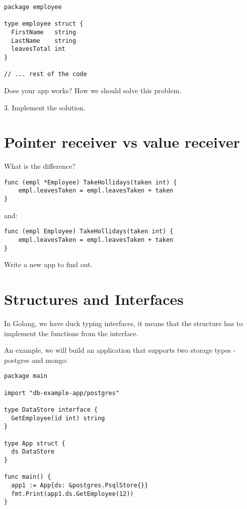 \documentclass[11pt, letterpaper]{article}
\begin{document}
\begin{verbatim}
package employee

type employee struct {
  FirstName   string
  LastName    string
  leavesTotal int
}

// ... rest of the code
\end{verbatim}

Does your app works? How we should solve this problem.

\bigskip

3. Implement the solution.



\section{Pointer receiver vs value receiver}

What is the difference?

\begin{verbatim}
func (empl *Employee) TakeHollidays(taken int) {
    empl.leavesTaken = empl.leavesTaken + taken
}
\end{verbatim}

and:

\begin{verbatim}
func (empl Employee) TakeHollidays(taken int) {
    empl.leavesTaken = empl.leavesTaken + taken
}
\end{verbatim}

Write a new app to find out.

\section{Structures and Interfaces}

In Golang, we have duck typing interfaces, it means that the structure has to implement the functions from the interface.

An example, we will build an application that supports two storage types - postgres and mongo:

\begin{verbatim}
package main

import "db-example-app/postgres"

type DataStore interface {
  GetEmployee(id int) string
}

type App struct {
  ds DataStore
}

func main() {
  app1 := App{ds: &postgres.PsqlStore{}}
  fmt.Print(app1.ds.GetEmployee(12))
}
\end{verbatim}
\end{document}
